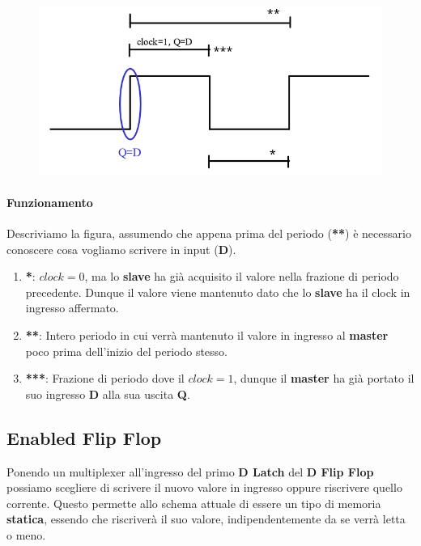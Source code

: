 \documentclass{article}
\begin{document}
\begin{figure}[htbp]
    \includegraphics[scale=0.25]{img/clock_flip_flop.png}
    \centering
\end{figure}

\paragraph{Funzionamento} Descriviamo la figura, assumendo che appena prima del periodo (\textbf{**}) è necessario conoscere cosa vogliamo scrivere in input (\textbf{D}).

\begin{enumerate}
    \item \textbf{*}: $clock = 0$, ma lo \textbf{slave} ha già acquisito il valore nella frazione di periodo precedente. Dunque il valore viene mantenuto dato che lo \textbf{slave} ha il clock in ingresso affermato. 
    \item \textbf{**}: Intero periodo in cui verrà mantenuto il valore in ingresso al \textbf{master} poco prima dell'inizio del periodo stesso.
    \item \textbf{***}: Frazione di periodo dove il $clock = 1$, dunque il \textbf{master} ha già portato il suo ingresso \textbf{D} alla sua uscita \textbf{Q}.
\end{enumerate}

\newpage

\subsection{Enabled Flip Flop}

Ponendo un multiplexer all'ingresso del primo \textbf{D Latch} del \textbf{D Flip Flop}
possiamo scegliere di scrivere il nuovo valore in ingresso oppure riscrivere quello corrente. Questo permette allo schema attuale di essere un tipo di memoria \textbf{statica}, essendo che riscriverà il suo valore, indipendentemente da se verrà letta o meno.
\end{document}
